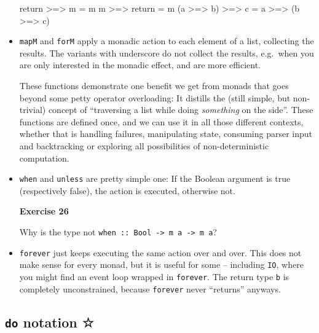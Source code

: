 \documentclass[11pt,
  american,
  DIV13]{article}
\newenvironment{Shaded}{}{}
\newcommand{\FunctionTok}[1]{\textcolor[rgb]{0.02,0.16,0.49}{#1}}
\newcommand{\NormalTok}[1]{#1}
\newcommand{\OperatorTok}[1]{\textcolor[rgb]{0.40,0.40,0.40}{#1}}
\newcommand{\OtherTok}[1]{\textcolor[rgb]{0.00,0.44,0.13}{#1}}
\begin{document}
\begin{itemize}
\begin{Shaded}
\begin{Highlighting}[]
\FunctionTok{return} \OperatorTok{\textgreater{}=\textgreater{}}\NormalTok{ m }\OtherTok{=}\NormalTok{ m}
\NormalTok{m }\OperatorTok{\textgreater{}=\textgreater{}} \FunctionTok{return} \OtherTok{=}\NormalTok{ m}
\NormalTok{(a }\OperatorTok{\textgreater{}=\textgreater{}}\NormalTok{ b) }\OperatorTok{\textgreater{}=\textgreater{}}\NormalTok{ c }\OtherTok{=}\NormalTok{ a }\OperatorTok{\textgreater{}=\textgreater{}}\NormalTok{ (b }\OperatorTok{\textgreater{}=\textgreater{}}\NormalTok{ c)}
\end{Highlighting}
\end{Shaded}
\item
  \texttt{mapM} and \texttt{forM} apply a monadic action to each element
  of a list, collecting the results. The variants with underscore do not
  collect the results, e.g.~when you are only interested in the monadic
  effect, and are more efficient.

  These functions demonstrate one benefit we get from monads that goes
  beyond some petty operator overloading: It distills the (still simple,
  but non-trivial) concept of ``traversing a list while doing
  \emph{something} on the side''. These functions are defined once, and
  we can use it in all those different contexts, whether that is
  handling failures, manipulating state, consuming parser input and
  backtracking or exploring all possibilities of non-deterministic
  computation.
\item
  \texttt{when} and \texttt{unless} are pretty simple one: If the
  Boolean argument is true (respectively false), the action is executed,
  otherwise not.

  \textbf{Exercise 26}

  Why is the type not
  \texttt{when\ ::\ Bool\ -\textgreater{}\ m\ a\ -\textgreater{}\ m\ a}?
\item
  \texttt{forever} just keeps executing the same action over and over.
  This does not make sense for every monad, but it is useful for some --
  including \texttt{IO}, where you might find an event loop wrapped in
  \texttt{forever}. The return type \texttt{b} is completely
  unconstrained, because \texttt{forever} never ``returns'' anyways.
\end{itemize}

\hypertarget{do-notation}{%
\subsection{\texorpdfstring{\texttt{do} notation
☆}{do notation ☆}}\label{do-notation}}
\end{document}
